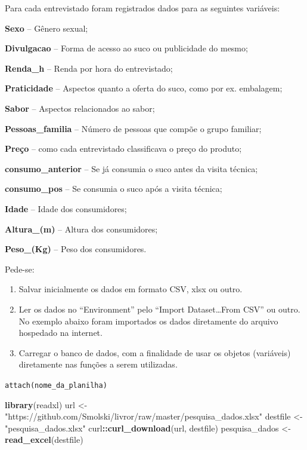 \documentclass[12pt,brazil,oneside]{book}
\newenvironment{Shaded}{\begin{snugshade}}{\end{snugshade}}
\newcommand{\KeywordTok}[1]{\textcolor[rgb]{0.13,0.29,0.53}{\textbf{#1}}}
\newcommand{\NormalTok}[1]{#1}
\newcommand{\OperatorTok}[1]{\textcolor[rgb]{0.81,0.36,0.00}{\textbf{#1}}}
\newcommand{\StringTok}[1]{\textcolor[rgb]{0.31,0.60,0.02}{#1}}
\begin{document}
Para cada entrevistado foram registrados dados para as seguintes variáveis:

\textbf{Sexo} -- Gênero sexual;

\textbf{Divulgacao} -- Forma de acesso ao suco ou publicidade do mesmo;

\textbf{Renda\_h} -- Renda por hora do entrevistado;

\textbf{Praticidade} -- Aspectos quanto a oferta do suco, como por ex. embalagem;

\textbf{Sabor} -- Aspectos relacionados ao sabor;

\textbf{Pessoas\_familia} -- Número de pessoas que compõe o grupo familiar;

\textbf{Preço} -- como cada entrevistado classificava o preço do produto;

\textbf{consumo\_anterior} -- Se já consumia o suco antes da visita técnica;

\textbf{consumo\_pos} -- Se consumia o suco após a visita técnica;

\textbf{Idade} -- Idade dos consumidores;

\textbf{Altura\_(m)} -- Altura dos consumidores;

\textbf{Peso\_(Kg)} -- Peso dos consumidores.

Pede-se:

\begin{enumerate}
\def\labelenumi{\arabic{enumi}.}
\item
  Salvar inicialmente os dados em formato CSV, xlsx ou outro.
\item
  Ler os dados no ``Environment'' pelo ``Import Dataset\ldots{}From CSV'' ou outro. No exemplo abaixo foram importados os dados diretamente do arquivo hospedado na internet.
\item
  Carregar o banco de dados, com a finalidade de usar os objetos (variáveis) diretamente nas funções a serem utilizadas.
\end{enumerate}

\texttt{attach(nome\_da\_planilha)}

\begin{Shaded}
\begin{Highlighting}[]
\KeywordTok{library}\NormalTok{(readxl)}
\NormalTok{url <-}\StringTok{ "https://github.com/Smolski/livror/raw/master/pesquisa_dados.xlsx"}
\NormalTok{destfile <-}\StringTok{ "pesquisa_dados.xlsx"}
\NormalTok{curl}\OperatorTok{::}\KeywordTok{curl_download}\NormalTok{(url, destfile)}
\NormalTok{pesquisa_dados <-}\StringTok{ }\KeywordTok{read_excel}\NormalTok{(destfile)}
\end{Highlighting}
\end{Shaded}
\end{document}
